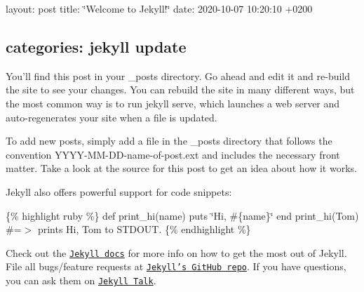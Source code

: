 

 layout\+: post title\+: \char`\"{}\+Welcome to Jekyll!\char`\"{} date\+: 2020-\/10-\/07 10\+:20\+:10 +0200 \subsection*{categories\+: jekyll update }

You’ll find this post in your {\ttfamily \+\_\+posts} directory. Go ahead and edit it and re-\/build the site to see your changes. You can rebuild the site in many different ways, but the most common way is to run {\ttfamily jekyll serve}, which launches a web server and auto-\/regenerates your site when a file is updated.

To add new posts, simply add a file in the {\ttfamily \+\_\+posts} directory that follows the convention {\ttfamily Y\+Y\+Y\+Y-\/\+M\+M-\/\+D\+D-\/name-\/of-\/post.\+ext} and includes the necessary front matter. Take a look at the source for this post to get an idea about how it works.

Jekyll also offers powerful support for code snippets\+:

\{\% highlight ruby \%\} def print\+\_\+hi(name) puts \char`\"{}\+Hi, \#\{name\}\char`\"{} end print\+\_\+hi(\textquotesingle{}Tom\textquotesingle{}) \#=$>$ prints \textquotesingle{}Hi, Tom\textquotesingle{} to S\+T\+D\+O\+UT. \{\% endhighlight \%\}

Check out the \href{http://jekyllrb.com/docs/home}{\tt Jekyll docs} for more info on how to get the most out of Jekyll. File all bugs/feature requests at \href{https://github.com/jekyll/jekyll}{\tt Jekyll’s Git\+Hub repo}. If you have questions, you can ask them on \href{https://talk.jekyllrb.com/}{\tt Jekyll Talk}. 